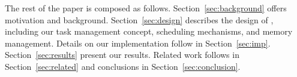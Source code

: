 
The rest of the paper is composed as
follows. Section~\ref{sec:background} offers motivation and background.
Section~\ref{sec:design} describes the design of \tsar,
including our task management concept, scheduling mechanisms, and
memory management. Details on our implementation follow in
Section~\ref{sec:imp}.  Section~\ref{sec:results} present our results.
Related work follows in Section~\ref{sec:related} and conclusions in
Section~\ref{sec:conclusion}.

